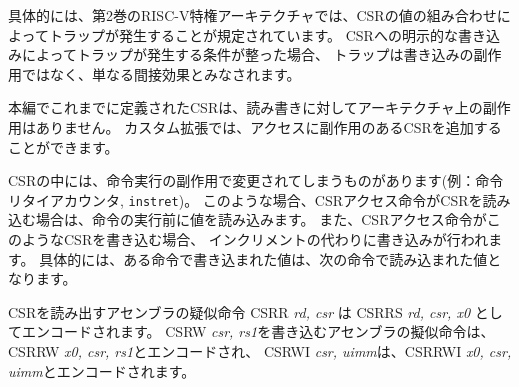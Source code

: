 \begin{commentary}
具体的には、第2巻のRISC-V特権アーキテクチャでは、CSRの値の組み合わせによってトラップが発生することが規定されています。
CSRへの明示的な書き込みによってトラップが発生する条件が整った場合、
トラップは書き込みの副作用ではなく、単なる間接効果とみなされます。

\begin{comment}
  The CSRs defined so far in this volume
  do not have any architectural side effects on reads or writes.
  Custom extensions might add CSRs for which accesses have side effects.
\end{comment}

本編でこれまでに定義されたCSRは、読み書きに対してアーキテクチャ上の副作用はありません。
カスタム拡張では、アクセスに副作用のあるCSRを追加することができます。
\end{commentary}

\begin{comment}
Some CSRs, such as the instructions-retired counter, {\tt instret},
may be modified as side effects of instruction execution.  In these
cases, if a CSR access instruction reads a CSR, it reads the value
prior to the execution of the instruction.  If a CSR access
instruction writes such a CSR, the write is done instead of the
increment.  In particular, a value written to {\tt instret} by one
instruction will be the value read by the following instruction.
\end{comment}

CSRの中には、命令実行の副作用で変更されてしまうものがあります(例：命令リタイアカウンタ, {\tt instret})。
このような場合、CSRアクセス命令がCSRを読み込む場合は、命令の実行前に値を読み込みます。
また、CSRアクセス命令がこのようなCSRを書き込む場合、
インクリメントの代わりに書き込みが行われます。
具体的には、ある命令で書き込まれた値は、次の命令で読み込まれた値となります。

\begin{comment}
The assembler pseudoinstruction to read a CSR, CSRR {\em rd, csr}, is
encoded as CSRRS {\em rd, csr, x0}.  The assembler pseudoinstruction
to write a CSR, CSRW {\em csr, rs1}, is encoded as CSRRW {\em x0, csr,
  rs1}, while CSRWI {\em csr, uimm}, is encoded as CSRRWI {\em x0,
  csr, uimm}.
\end{comment}

CSRを読み出すアセンブラの疑似命令 CSRR {\em rd, csr} は CSRRS {\em rd, csr, x0} としてエンコードされます。
CSRW {\em csr, rs1}を書き込むアセンブラの擬似命令は、CSRRW {\em x0, csr, rs1}とエンコードされ、
CSRWI {\em csr, uimm}は、CSRRWI {\em x0, csr, uimm}とエンコードされます。

